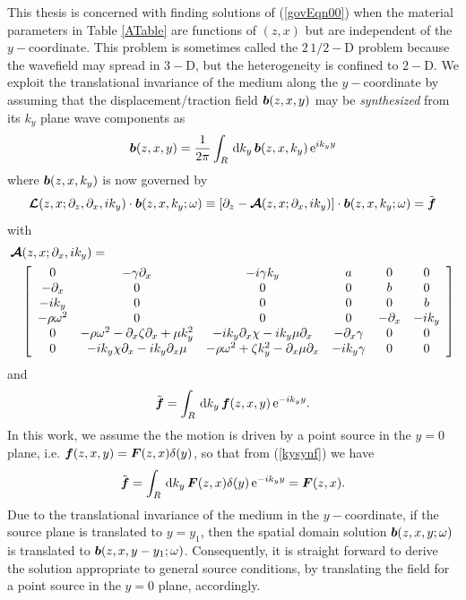 \documentclass[11pt]{article}
\newcommand{\CB}[1]{\mbox{\boldmath$\cal #1$\unboldmath}}
\newcommand{\bmi}[1]{\mbox{\boldmath$\mit #1$\unboldmath}}
\begin{document}
This thesis is concerned with finding solutions of (\ref{govEqn00}) when
the material parameters in Table \ref{ATable} are functions of $(z,x)$ but are
independent of  the $y-$coordinate. This problem is sometimes called the
$2\,{1/2}-$D problem because the wavefield may spread in $3-$D,
but the heterogeneity is confined to $2-$D.
We exploit the translational invariance of the medium along the
$y-$coordinate by assuming that the displacement/traction field ${\bmi
b}(z,x,y)$ may be {\em synthesized\/} from its  $k_y$ plane wave components as
\begin{equation} \label{kysyn}
{\bmi b}(z,x,y)={\frac{1}{2\pi }}\int_{R} \, {\rm d}{k}_{y}\,{\bmi
b}(z,x,{k}_{y})\, {\rm e}^{i{k}_{y}y}
\end{equation}
where ${\bmi b}(z,x,{k}_{y})$ is now governed by
\begin{equation} \label{govEqn0}
{\CB L}(z,x;{\partial }_{z},{\partial }_{x},i {k}_{y})\cdot {\bmi  b
}(z,x,k_y; \omega)\equiv
\left[\partial_{z}-{\CB A}(z,x;{\partial }_{x},i {k}_{y})\right]\cdot {\bmi  b }(z,x,k_y;
\omega)=
\tilde{\bmi  f}
\end{equation}
with
\begin{eqnarray} \label{Adef}
\lefteqn{{\CB A}(z,x;{\partial }_{x},i {k}_{y})
=}\nonumber\\
&&\left[{\begin{array}{cccccc}
0&- \gamma {\partial }_{  x}&  -i \gamma {  k}_{  y}&  a&0&0\\ -{ \partial
}_{x}&0&0&0&b&0\\ -i{k}_{y}&0&0&0&0&b\\ - \rho {\omega }^{
2}&  0&0&0&-{ \partial }_{x}&-i{k}_{y}\\ 0&- \rho {\omega
}^{  2}  -{ \partial }_{x} \zeta {\partial }_{
x}  + \mu {  k}_{  y}^{  2}&
-i{k}_{y}{ \partial }_{x} \chi   -i{k}_{y} \mu {\partial
}_{  x}&  -{ \partial }_{x} \gamma &  0&0\\
0&-i{k}_{y} \chi {\partial }_{  x}  -i{k}_{y}{ \partial
}_{x} \mu &  - \rho {\omega }^{  2}  + \zeta
{  k}_{  y}^{  2}  -{ \partial }_{x} \mu
{\partial }_{  x}&  -i{k}_{y} \gamma &  0&0\end{array}}\right]
\end{eqnarray}
and
\begin{equation} \label{kysynf}
\tilde{\bmi f}=\int_{R} \, {\rm d}{k}_{y}\,{\bmi f}(z,x,y)
\, {\rm e}^{-i{k}_{y}y}.
\end{equation}
In this work, we assume the the motion is driven by a point source in the
$y=0$ plane, i.e. ${\bmi f}(z,x,y)= {\bmi F}(z,x) \delta(y)$, so that
from (\ref{kysynf}) we have
\begin{equation} \label{kysynf1}
\tilde{\bmi f}=\int_{R} \, {\rm d}{k}_{y}\,{\bmi F}(z,x) \delta(y)
\, {\rm e}^{-i{k}_{y}y} = {\bmi F}(z,x).
\end{equation}
Due to the translational invariance of the medium in the $y-$coordinate,
if the source plane is translated to  $y=y_1$, then the spatial domain solution
${\bmi  b }(z,x,y; \omega)$ is translated to  ${\bmi  b }(z,x,y-y_1;
\omega)$. Consequently, it is straight forward to derive the solution
appropriate to general source conditions, by translating the field
for a point source in the $y=0$ plane, accordingly.
\end{document}
